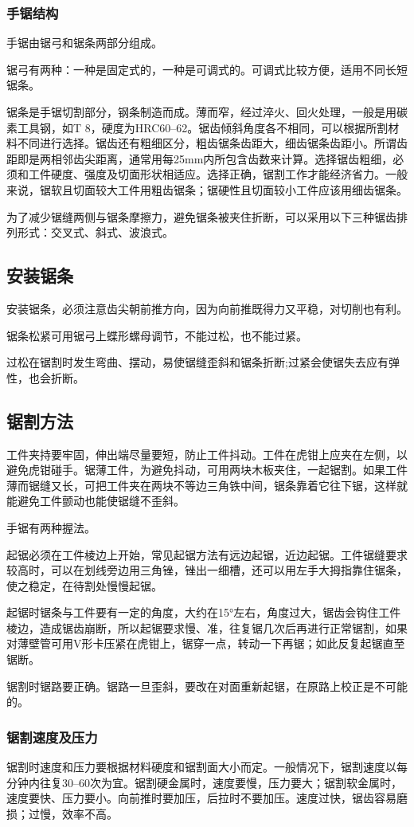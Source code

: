 \documentclass{ctexbook}
\begin{document}
\subsubsection{手锯结构}
手锯由锯弓和锯条两部分组成。

锯弓有两种：一种是固定式的，一种是可调式的。可调式比较方便，适用不同长短锯条。

锯条是手锯切割部分，钢条制造而成。薄而窄，经过淬火、回火处理，一般是用碳素工具钢，如T 8，硬度为HRC60--62。锯齿倾斜角度各不相同，可以根据所割材料不同进行选择。锯齿还有粗细区分，粗齿锯条齿距大，细齿锯条齿距小。所谓齿距即是两相邻齿尖距离，通常用每25mm内所包含齿数来计算。选择锯齿粗细，必须和工件硬度、强度及切面形状相适应。选择正确，锯割工作才能经济省力。一般来说，锯软且切面较大工件用粗齿锯条；锯硬性且切面较小工件应该用细齿锯条。

为了减少锯缝两侧与锯条摩擦力，避免锯条被夹住折断，可以采用以下三种锯齿排列形式：交叉式、斜式、波浪式。
\subsection{安装锯条}
安装锯条，必须注意齿尖朝前推方向，因为向前推既得力又平稳，对切削也有利。

锯条松紧可用锯弓上蝶形螺母调节，不能过松，也不能过紧。

过松在锯割时发生弯曲、摆动，易使锯缝歪斜和锯条折断;过紧会使锯失去应有弹性，也会折断。
\subsection{锯割方法}
工件夹持要牢固，伸出端尽量要短，防止工件抖动。工件在虎钳上应夹在左侧，以避免虎钳碰手。锯薄工件，为避免抖动，可用两块木板夹住，一起锯割。如果工件薄而锯缝又长，可把工件夹在两块不等边三角铁中间，锯条靠着它往下锯，这样就能避免工件颤动也能使锯缝不歪斜。

手锯有两种握法。

起锯必须在工件棱边上开始，常见起锯方法有远边起锯，近边起锯。工件锯缝要求较高时，可以在划线旁边用三角锉，锉出一细槽，还可以用左手大拇指靠住锯条，使之稳定，在待割处慢慢起锯。

起锯时锯条与工件要有一定的角度，大约在15°左右，角度过大，锯齿会钩住工件棱边，造成锯齿崩断，所以起锯要求慢、准，往复锯几次后再进行正常锯割，如果对薄壁管可用V形卡压紧在虎钳上，锯穿一点，转动一下再锯；如此反复起锯直至锯断。

锯割时锯路要正确。锯路一旦歪斜，要改在对面重新起锯，在原路上校正是不可能的。
\subsubsection{锯割速度及压力}
锯割时速度和压力要根据材料硬度和锯割面大小而定。一般情况下，锯割速度以每分钟内往复30--60次为宜。锯割硬金属时，速度要慢，压力要大；锯割软金属时，速度要快、压力要小。向前推时要加压，后拉时不要加压。速度过快，锯齿容易磨损；过慢，效率不高。
\end{document}

